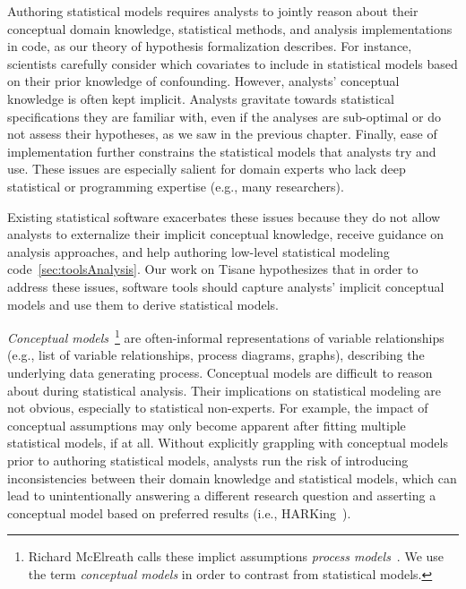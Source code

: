 \def\adult{\texttt{adult}\xspace}
\def\poundslost{\texttt{pounds\_lost}\xspace}
\def\motivation{\texttt{motivation}\xspace}
\def\regimen{\texttt{regimen\_condition}\xspace}
\def\regimencondition{\texttt{regimen\_condition}\xspace}
\def\group{\texttt{group}\xspace}
\def\age{\texttt{age}\xspace}


Authoring statistical models requires analysts to jointly reason about their
conceptual domain knowledge, statistical methods, and analysis implementations
in code, as our theory of hypothesis formalization describes. For instance,
scientists carefully consider which covariates to include in statistical models
based on their prior knowledge of confounding. However, analysts' conceptual
knowledge is often kept implicit. Analysts gravitate towards statistical
specifications they are familiar with, even if the analyses are sub-optimal or
do not assess their hypotheses, as we saw in the previous chapter. Finally, ease
of implementation further constrains the statistical models that analysts try
and use. These issues are especially salient for domain experts who lack deep
statistical or programming expertise (e.g., many researchers).

Existing statistical software exacerbates these issues because they do not allow
analysts to externalize their implicit conceptual knowledge, receive guidance on
analysis approaches, and help authoring low-level statistical modeling
code~\autoref{sec:toolsAnalysis}. Our work on Tisane hypothesizes that in order
to address these issues, software tools should capture analysts' implicit
conceptual models and use them to derive statistical models. 

\textit{Conceptual models}~\footnote{Richard McElreath calls these implict
assumptions \textit{process models}~\cite{mcelreath2020statistical}. We use the
term \textit{conceptual models} in order to contrast from statistical models.}
are often-informal representations of variable relationships (e.g., list of
variable relationships, process diagrams, graphs), describing the underlying
data generating process. Conceptual models are difficult to reason about during
statistical analysis. Their implications on statistical modeling are not
obvious, especially to statistical non-experts. For example, the impact of
conceptual assumptions may only become apparent after fitting multiple
statistical models, if at all. Without explicitly grappling with conceptual
models prior to authoring statistical models, analysts run the risk of
introducing inconsistencies between their domain knowledge and statistical
models, which can lead to unintentionally answering a different research
question and asserting a conceptual model based on preferred results (i.e.,
HARKing~\cite{kerr1998harking}). 


